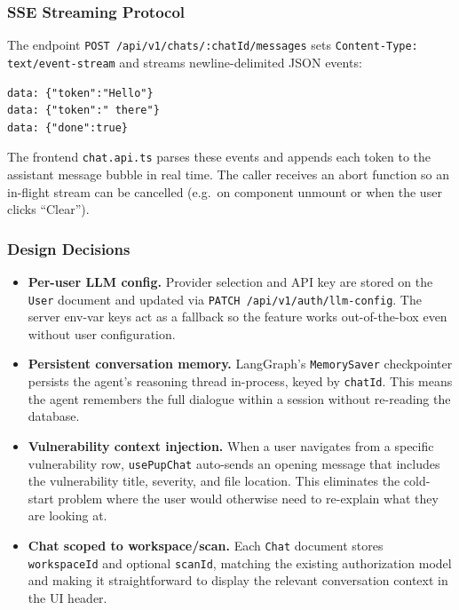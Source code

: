 \documentclass[12pt,a4paper]{report}
\begin{document}
\subsubsection{SSE Streaming Protocol}

The endpoint \texttt{POST /api/v1/chats/:chatId/messages} sets \texttt{Content-Type: text/event-stream} and streams newline-delimited JSON events:

\begin{verbatim}
data: {"token":"Hello"}
data: {"token":" there"}
data: {"done":true}
\end{verbatim}

The frontend \texttt{chat.api.ts} parses these events and appends each token to the assistant message bubble in real time. The caller receives an abort function so an in-flight stream can be cancelled (e.g.\ on component unmount or when the user clicks ``Clear'').

\subsubsection{Design Decisions}

\begin{itemize}
    \item \textbf{Per-user LLM config.} Provider selection and API key are stored on the \texttt{User} document and updated via \texttt{PATCH /api/v1/auth/llm-config}. The server env-var keys act as a fallback so the feature works out-of-the-box even without user configuration.
    \item \textbf{Persistent conversation memory.} LangGraph's \texttt{MemorySaver} checkpointer persists the agent's reasoning thread in-process, keyed by \texttt{chatId}. This means the agent remembers the full dialogue within a session without re-reading the database.
    \item \textbf{Vulnerability context injection.} When a user navigates from a specific vulnerability row, \texttt{usePupChat} auto-sends an opening message that includes the vulnerability title, severity, and file location. This eliminates the cold-start problem where the user would otherwise need to re-explain what they are looking at.
    \item \textbf{Chat scoped to workspace/scan.} Each \texttt{Chat} document stores \texttt{workspaceId} and optional \texttt{scanId}, matching the existing authorization model and making it straightforward to display the relevant conversation context in the UI header.
\end{itemize}
\end{document}
